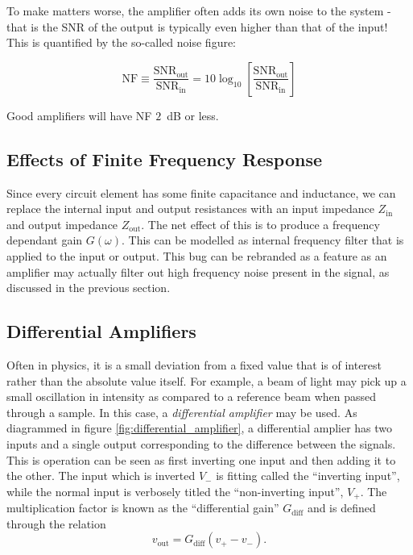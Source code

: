 \documentclass[]{article}
\begin{document}
To make matters worse, the amplifier often adds its own noise to the system - that is the SNR of the output is typically even higher than that of the input! This is quantified by the so-called noise figure:

\begin{equation}
\label{eq:def_noise_figure}
\text{NF} \equiv \frac{\text{SNR}_\text{out}}{\text{SNR}_\text{in}} = 10\log_{10}\left[\frac{\text{SNR}_\text{out}}{\text{SNR}_\text{in}}\right]
\end{equation}

\noindent Good amplifiers will have NF $2$~dB or less.

\subsection{Effects of Finite Frequency Response}
Since every circuit element has some finite capacitance and inductance, we can replace the internal input and output resistances with an input impedance $Z_\text{in}$ and output impedance $Z_\text{out}$. The net effect of this is to produce a frequency dependant gain $G(\omega)$. This can be modelled as internal frequency filter that is applied to the input or output. This bug can be rebranded as a feature as an amplifier may actually filter out high frequency noise present in the signal, as discussed in the previous section.

\subsection{Differential Amplifiers}
\label{sec:diff_amps}
Often in physics, it is a small deviation from a fixed value that is of interest rather than the absolute value itself. For example, a beam of light may pick up a small oscillation in intensity as compared to a reference beam when passed through a sample. In this case, a \textit{differential amplifier} may be used. As diagrammed in figure \ref{fig:differential_amplifier}, a differential amplier has two inputs and a single output corresponding to the difference between the signals. This is operation can be seen as first inverting one input and then adding it to the other. The input which is inverted $V_-$ is fitting called the ``inverting input'', while the normal input is verbosely titled the ``non-inverting input'', $V_+$. The multiplication factor is known as the ``differential gain'' $G_\text{diff}$ and is defined through the relation
\begin{equation}
\label{eq:def_diff_amp}
v_\text{out} = G_\text{diff}\left(v_+-v_-\right).
\end{equation}
\end{document}

